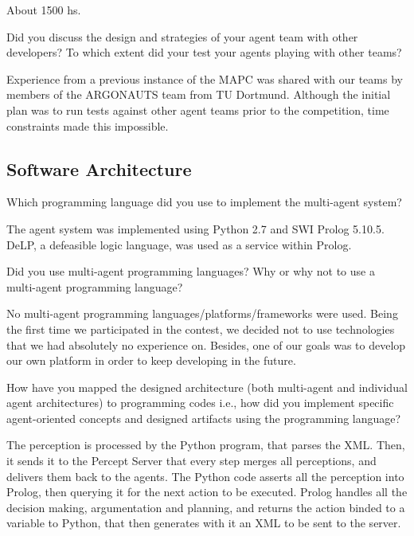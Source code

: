 About 1500 hs.

\begin{question}
Did you discuss the design and strategies of your agent team with other
developers? To which extent did your test your agents playing with other
teams?
\end{question}

Experience from a previous instance of the MAPC was shared with our
teams by members of the ARGONAUTS team from TU Dortmund\cite{Holzgen:2011}. Although the
initial plan was to run tests against other agent teams prior to the
competition, time constraints made this impossible.

\subsection{Software Architecture}
\setcounter{question}{0}
\begin{question}
Which programming language did you use to
implement the multi-agent system?  
\end{question}

The agent system was implemented using
Python 2.7 and SWI Prolog 5.10.5. DeLP, a defeasible logic language, was used
as a service within Prolog.

\begin{question}
Did you use multi-agent programming languages? Why or why not to use a
multi-agent programming language?  
\end{question}

No multi-agent programming
languages/platforms/frameworks were used. Being the first time we participated
in the contest, we decided not to use technologies that we had absolutely no experience on. Besides,
one of our goals was to develop our own platform in order to keep developing in the future.

\begin{question}
How have you mapped the designed architecture (both multi-agent and
individual agent architectures) to programming codes i.e., how did you
implement specific agent-oriented concepts and designed artifacts using the
programming language?  
\end{question}

The perception is processed by the Python program, that
parses the XML. Then, it sends it to the Percept Server that every step merges
all perceptions, and delivers them back to the agents.  The Python code
asserts all the perception into Prolog, then querying it for the next action
to be executed.  Prolog handles all the decision making, argumentation and
planning, and returns the action binded to a variable to Python, that then
generates with it an XML to be sent to the server.

